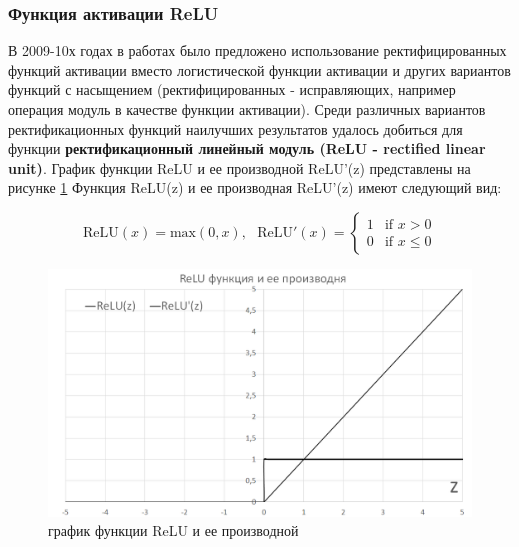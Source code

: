 \documentclass[12pt]{article}
\begin{document}
\begin{sloppypar}
\subsubsection{Функция активации ReLU}
В 2009-10х годах в работах \cite{jarrett2009best, nair2010rectified} было предложено использование ректифицированных функций активации вместо логистической функции активации и других вариантов функций с насыщением (ректифицированных - исправляющих, например операция модуль в качестве функции активации). Среди различных вариантов ректификационных функций наилучших результатов удалось добиться для функции \textbf{ректификационный линейный модуль (ReLU - rectified linear unit)}.
График функции ReLU и ее производной ReLU'(z) представлены на рисунке \ref{ch1:fig:relu}
Функция ReLU(z) и ее производная ReLU'(z) имеют следующий вид:

\begin{equation}
    \label{ch1:eqn:relu}
    \mbox{ReLU}(x)=\mbox{max$(0,x)$}, \ \ \ \mbox{ReLU}'(x) =
    \begin{cases}
        \mbox{$1$} & \mbox{if } x > 0\\
        \mbox{$0$} & \mbox{if } x \leq 0
    \end{cases}
\end{equation}

\begin{figure}[h]
	\begin{center}
		\includegraphics[width=0.75\linewidth]{./figuresch1/relu.png}
		\caption{график функции ReLU и ее производной}		
		\label{ch1:fig:relu}
	\end{center}
\end{figure}


\end{sloppypar}
\end{document}
